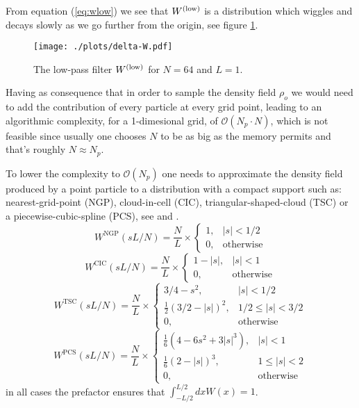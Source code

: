 From equation (\ref{eq:wlow}) we see that $W^\mathrm{(low)}$ is a distribution
which wiggles and decays slowly as we go further from the origin,
see figure \ref{fig:wdelta}.
\begin{figure}
    \centering\texttt{[image: ./plots/delta-W.pdf]}
    \caption{The low-pass filter $W^\mathrm{(low)}$ for $N=64$ and $L=1$.}
    \label{fig:wdelta}
\end{figure}
Having as consequence that in order to sample the density field $\rho_o$
we would need to add the contribution
of every particle at every grid point, leading to an 
algorithmic complexity, for a 1-dimesional grid, of $\mathcal{O}(N_p \cdot N)$, which is not feasible
since usually one chooses $N$ to be as big as the memory permits and that's roughly $N\approx N_p$.



To lower the complexity to $\mathcal{O}(N_p)$ one needs to approximate 
the density field produced by a point particle to a distribution with a compact support
such as: nearest-grid-point (NGP), cloud-in-cell (CIC), triangular-shaped-cloud (TSC)
or a piecewise-cubic-spline (PCS), see \cite{sefusatti} and \cite{hockney}.
\begin{equation}
    W^{\text{NGP}}(s L/N) = 
    \frac{N}{L} \times
    \begin{cases} 
        1, & |s|< 1/2 \\
        0, &\text{otherwise}
    \end{cases}
\end{equation}
\begin{equation}
    W^{\text{CIC}}(s L/N) = 
    \frac{N}{L} \times
    \begin{cases} 
        1-|s|, & |s|< 1 \\
        0, &\text{otherwise}
    \end{cases}
\end{equation}
\begin{equation}
    W^{\text{TSC}}(s L/N) = 
    \frac{N}{L} \times
    \begin{cases} 
        3/4 - s^2, & |s|< 1/2 \\
        \frac{1}{2}(3/2 - |s|)^2, & 1/2 \le |s|< 3/2 \\
        0, &\text{otherwise}
    \end{cases}
\end{equation}
\begin{equation}
    W^{\text{PCS}}(s L/N) = 
    \frac{N}{L} \times
    \begin{cases} 
        \frac{1}{6}(4-6s^2+3|s|^3), & |s|< 1 \\
        \frac{1}{6}(2-|s|)^3, & 1\le |s| <2 \\
        0, &\text{otherwise}
    \end{cases}
\end{equation}
in all cases the prefactor ensures that $\int_{-L/2}^{L/2} dx W(x)  =1$.

